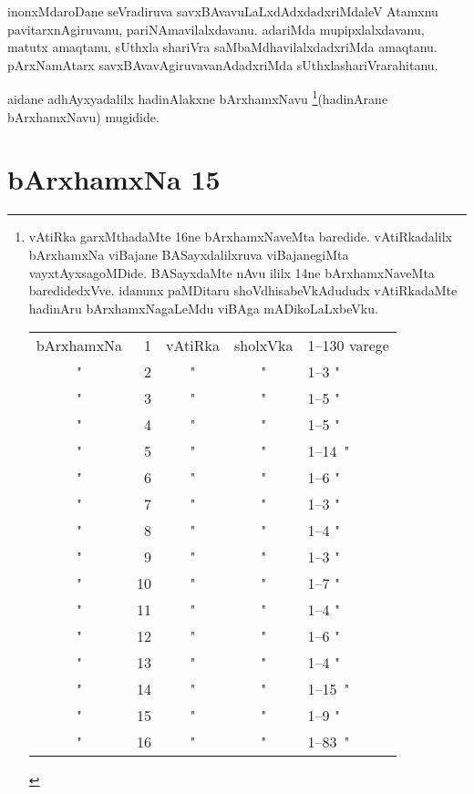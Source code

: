 \begin{artha} 
inonxMdaroDane seVradiruva savxBAvavuLaLxdAdxdadxriMdaleV Atamxnu 
pavitarxnAgiruvanu, pariNAmavilalxdavanu. adariMda mupipxlalxdavanu, 
matutx amaqtanu, sUthxla shariVra saMbaMdhavilalxdadxriMda amaqtanu. 
pArxNamAtarx savxBAvavAgiruvavanAdadxriMda sUthxlashariVrarahitanu.
\end{artha}

aidane adhAyxyadalilx hadinAlakxne bArxhamxNavu 
\footnote[2]{vAtiRka garxMthadaMte 16ne bArxhamxNaveMta baredide. 
vAtiRkadalilx bArxhamxNa viBajane BASayxdalilxruva viBajanegiMta 
vayxtAyxsagoMDide. BASayxdaMte nAvu ililx 14ne bArxhamxNaveMta 
baredidedxVve. idanunx paMDitaru shoVdhisabeVkAdududx vAtiRkadaMte 
hadinAru bArxhamxNagaLeMdu viBAga mADikoLaLxbeVku.\\ 
\begin{tabular}{crccl}bArxhamxNa & 1 & vAtiRka & sholxVka & 1{\rm --}130 
varege\\
" & 2 & " & " & 1{\rm --}3 \qquad "\\
" & 3 & " & " & 1{\rm --}5 \qquad "\\ 
" & 4 & " & " & 1{\rm --}5 \qquad "\\
" & 5 & " & " & 1{\rm --}14 \quad \,"\\ 
" & 6 & " & " & 1{\rm --}6 \qquad "\\
" & 7 & " & " & 1{\rm --}3 \qquad "\\
" & 8 & " & " & 1{\rm --}4 \qquad "\\
" & 9 & " & " & 1{\rm --}3 \qquad "\\
" & 10 & " & " & 1{\rm --}7 \qquad "\\
" & 11 & " & " & 1{\rm --}4 \qquad "\\
" & 12 & " & " & 1{\rm --}6 \qquad "\\
" & 13 & " & " & 1{\rm --}4 \qquad "\\
" & 14 & " & " & 1{\rm --}15 \quad \,"\\
" & 15 & " & " & 1{\rm --}9 \qquad "\\
" & 16 & " & " & 1{\rm --}83 \quad \,"\end{tabular}}(hadinArane bArxhamxNavu) mugidide.

\eject

\section*{bArxhamxNa 15}


